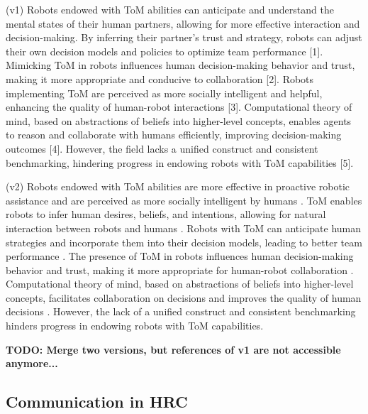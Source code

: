     (v1) Robots endowed with ToM abilities can anticipate and understand the mental states of their human partners, allowing for more effective interaction and decision-making. By inferring their partner's trust and strategy, robots can adjust their own decision models and policies to optimize team performance [1]. Mimicking ToM in robots influences human decision-making behavior and trust, making it more appropriate and conducive to collaboration [2]. Robots implementing ToM are perceived as more socially intelligent and helpful, enhancing the quality of human-robot interactions [3]. Computational theory of mind, based on abstractions of beliefs into higher-level concepts, enables agents to reason and collaborate with humans efficiently, improving decision-making outcomes [4]. However, the field lacks a unified construct and consistent benchmarking, hindering progress in endowing robots with ToM capabilities [5].

    (v2) Robots endowed with ToM abilities are more effective in proactive robotic assistance and are perceived as more socially intelligent by humans \cite{shvo_proactive_2022}. ToM enables robots to infer human desires, beliefs, and intentions, allowing for natural interaction between robots and humans \cite{yu_robot_2023}. Robots with ToM can anticipate human strategies and incorporate them into their decision models, leading to better team performance \cite{romeo_exploring_2022}. The presence of ToM in robots influences human decision-making behavior and trust, making it more appropriate for human-robot collaboration \cite{schlobach_abstracting_2022}. Computational theory of mind, based on abstractions of beliefs into higher-level concepts, facilitates collaboration on decisions and improves the quality of human decisions \cite{gurney_robots_2022}. However, the lack of a unified construct and consistent benchmarking hinders progress in endowing robots with ToM capabilities.

    \textbf{TODO: Merge two versions, but references of v1 are not accessible anymore...}

    
    \subsection{Communication in HRC}

